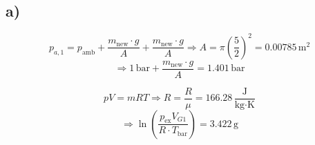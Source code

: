 

\subsection*{a)}
\[
p_{a,1} = p_{\text{amb}} + \frac{m_{\text{new}} \cdot g}{A} + \frac{m_{\text{new}} \cdot g}{A} \Rightarrow A = \pi \left( \frac{5}{2} \right)^2 = 0.00785 \, \text{m}^2
\]
\[
\Rightarrow 1 \, \text{bar} + \frac{m_{\text{new}} \cdot g}{A} = 1.401 \, \text{bar}
\]

\[
pV = mRT \Rightarrow R = \frac{R}{\mu} = 166.28 \, \frac{\text{J}}{\text{kg} \cdot \text{K}}
\]
\[
\Rightarrow \ln \left( \frac{p_{\text{ex}} V_{G1}}{R \cdot T_{\text{bar}}} \right) = 3.422 \, \text{g}
\]